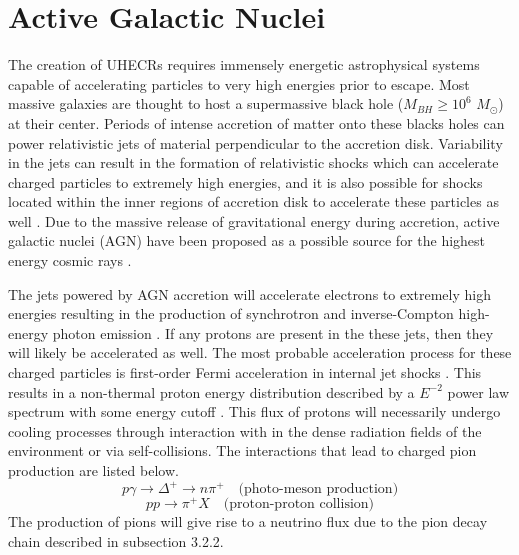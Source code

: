 \documentclass{gatech-thesis}
\begin{document}
\section{Active Galactic Nuclei}
The creation of UHECRs requires immensely energetic astrophysical systems capable of accelerating particles to very high energies prior to escape. Most massive galaxies are thought to host a supermassive black hole ($M_{BH} \geq 10^{6}$ $M_{\odot}$) at their center. Periods of intense accretion of matter onto these blacks holes can power relativistic jets of material perpendicular to the accretion disk. Variability in the jets can result in the formation of relativistic shocks which can accelerate charged particles to extremely high energies, and it is also possible for shocks located within the inner regions of accretion disk to accelerate these particles as well \cite{1996SSRv...75..341S}. Due to the massive release of gravitational energy during accretion, active galactic nuclei (AGN) have been proposed as a possible source for the highest energy cosmic rays \cite{1996SSRv...75..341S}.

The jets powered by AGN accretion will accelerate electrons to extremely high energies resulting in the production of synchrotron and inverse-Compton high-energy photon emission \cite{2008A&A...492..695B}. If any protons are present in the these jets, then they will likely be accelerated as well. The most probable acceleration process for these charged particles is first-order Fermi acceleration in internal jet shocks \cite{1995PhR...258..173G}. This results in a non-thermal proton energy distribution described by a $E^{-2}$ power law spectrum with some energy cutoff \cite{1995PhR...258..173G}. This flux of protons will necessarily undergo cooling processes through interaction with in the dense radiation fields of the environment or via self-collisions. The interactions that lead to charged pion production are listed below.
\begin{equation}
p\gamma \rightarrow \Delta^{+} \rightarrow n\pi^{+} \quad \text{(photo-meson production)}
\end{equation}
\begin{equation}
pp \rightarrow \pi^{+}X  \quad \text{(proton-proton collision)}
\end{equation}
The production of pions will give rise to a neutrino flux due to the pion decay chain described in subsection 3.2.2. 
\end{document}
